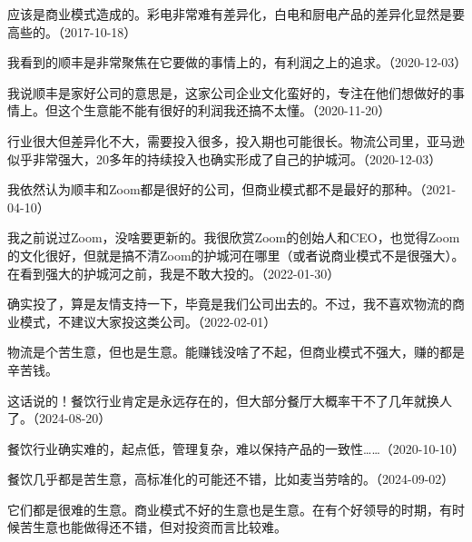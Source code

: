 应该是商业模式造成的。彩电非常难有差异化，白电和厨电产品的差异化显然是要高些的。（2017-10-18）


我看到的顺丰是非常聚焦在它要做的事情上的，有利润之上的追求。（2020-12-03）

我说顺丰是家好公司的意思是，这家公司企业文化蛮好的，专注在他们想做好的事情上。但这个生意能不能有很好的利润我还搞不太懂。（2020-11-20）


行业很大但差异化不大，需要投入很多，投入期也可能很长。物流公司里，亚马逊似乎非常强大，20多年的持续投入也确实形成了自己的护城河。（2020-12-03）


我依然认为顺丰和Zoom都是很好的公司，但商业模式都不是最好的那种。（2021-04-10）

我之前说过Zoom，没啥要更新的。我很欣赏Zoom的创始人和CEO，也觉得Zoom的文化很好，但就是搞不清Zoom的护城河在哪里（或者说商业模式不是很强大）。在看到强大的护城河之前，我是不敢大投的。（2022-01-30）


确实投了，算是友情支持一下，毕竟是我们公司出去的。不过，我不喜欢物流的商业模式，不建议大家投这类公司。（2022-02-01）


物流是个苦生意，但也是生意。能赚钱没啥了不起，但商业模式不强大，赚的都是辛苦钱。


这话说的！餐饮行业肯定是永远存在的，但大部分餐厅大概率干不了几年就换人了。（2024-08-20）

餐饮行业确实难的，起点低，管理复杂，难以保持产品的一致性……（2020-10-10）

餐饮几乎都是苦生意，高标准化的可能还不错，比如麦当劳啥的。（2024-09-02）


它们都是很难的生意。商业模式不好的生意也是生意。在有个好领导的时期，有时候苦生意也能做得还不错，但对投资而言比较难。

